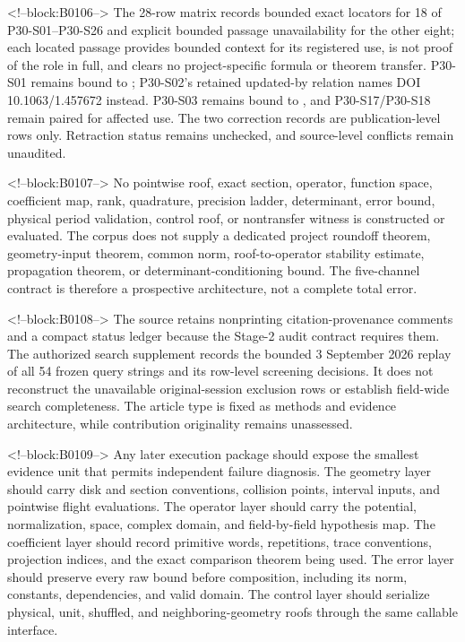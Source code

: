 \documentclass[11pt,a4paper]{article}
\begin{document}
<!--block:B0106-->
The 28-row matrix records bounded exact locators for 18 of
P30-S01--P30-S26 and explicit bounded passage unavailability for the other eight;
each located passage provides bounded context for its registered use, is not
proof of the role in full, and clears no project-specific formula or theorem
transfer. P30-S01 remains bound to \citep{P30-C01}; P30-S02's retained
updated-by relation names DOI 10.1063/1.457672 instead. P30-S03 remains bound
to \citep{P30-C02}, and P30-S17/P30-S18 remain paired for affected use.
The two correction records are publication-level rows only. Retraction status
remains unchecked, and source-level conflicts remain unaudited.

<!--block:B0107-->
No pointwise roof, exact section, operator, function space, coefficient map, rank, quadrature, precision ladder, determinant, error bound, physical period validation, control roof, or nontransfer witness is constructed or evaluated. The corpus does not supply a dedicated project roundoff theorem, geometry-input theorem, common norm, roof-to-operator stability estimate, propagation theorem, or determinant-conditioning bound. The five-channel contract is therefore a prospective architecture, not a complete total error.

<!--block:B0108-->
The source retains nonprinting citation-provenance comments and a compact status ledger because the Stage-2 audit contract requires them. The authorized search supplement records the bounded 3 September 2026 replay of all 54 frozen query strings and its row-level screening decisions. It does not reconstruct the unavailable original-session exclusion rows or establish field-wide search completeness. The article type is fixed as methods and evidence architecture, while contribution originality remains unassessed.

<!--block:B0109-->
Any later execution package should expose the smallest evidence unit that permits independent failure diagnosis. The geometry layer should carry disk and section conventions, collision points, interval inputs, and pointwise flight evaluations. The operator layer should carry the potential, normalization, space, complex domain, and field-by-field hypothesis map. The coefficient layer should record primitive words, repetitions, trace conventions, projection indices, and the exact comparison theorem being used. The error layer should preserve every raw bound before composition, including its norm, constants, dependencies, and valid domain. The control layer should serialize physical, unit, shuffled, and neighboring-geometry roofs through the same callable interface.
\end{document}
